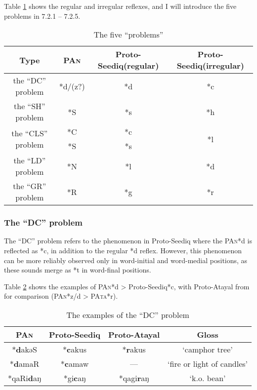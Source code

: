 \documentclass[12pt]{article}
\newcommand{\pan}{\textsc{PAn}\xspace}
\newcommand{\pata}{\textsc{PAta}\xspace}
\newcommand{\psedf}{Proto-Seediq\xspace}
\begin{document}
Table \ref{tab:5problems} shows the regular and irregular reflexes, and I will introduce the five problems in 7.2.1 -- 7.2.5.

\begin{table}[!htbp]
\centering
\caption{The five ``problems''}
\label{tab:5problems}
\begin{tabular}{cccc}
\hline
Type                                 & \pan    & \psedf (regular) & \psedf (irregular)  \\ \hline
the ``DC'' problem                   & *d/(z?) & *d               & *c                  \\ \hline
the ``SH'' problem                   & *S      & *s               & *h                  \\ \hline
\multirow{2}{*}{the ``CLS'' problem} & *C      & *c               & \multirow{2}{*}{*l} \\ 
                                     & *S      & *s               &                     \\ \hline
the ``LD'' problem                   & *N      & *l               & *d                  \\ \hline
the ``GR'' problem                   & *R      & *g               & *r                  \\ \hline
\end{tabular}
\end{table}

\subsubsection{The ``DC'' problem}

The ``DC'' problem refers to the phenomenon in \psedf where the \pan *d is reflected as *c, in addition to the regular *d reflex. However, this phenomenon can be more reliably observed only in word-initial and word-medial positions, as these sounds merge as *t in word-final positions.

Table \ref{tab:dc} shows the examples of \pan *d > \psedf *c, with Proto-Atayal from \textcite{goderich2020phd} for comparison (\pan *z/d > \pata *r). 

\begin{table}[!htbp]
\centering
\caption{The examples of the ``DC'' problem}
\label{tab:dc}
\begin{tabular}{cccc}
\hline
\pan     & \psedf & Proto-Atayal & Gloss                      \\ \hline
*\textbf{d}akəS   & *\textbf{c}akus & *\textbf{r}akus       & `camphor tree'             \\
*\textbf{d}amaR   & *\textbf{c}amaw & ---          & `fire or light of candles' \\
*qaRi\textbf{d}aŋ & *gi\textbf{c}aŋ & *qagi\textbf{r}aŋ     & `k.o. bean'                \\ \hline
\end{tabular}
\end{table}
\end{document}
